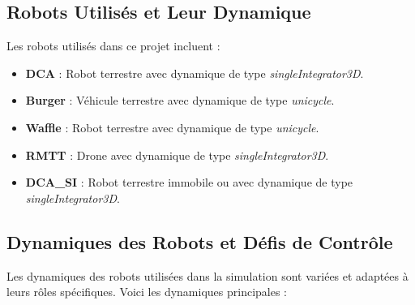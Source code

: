 \documentclass[a4paper,12pt]{article}
\begin{document}
\subsection*{Robots Utilisés et Leur Dynamique}
Les robots utilisés dans ce projet incluent :
\begin{itemize}
    \item \textbf{DCA} : Robot terrestre avec dynamique de type \textit{singleIntegrator3D}.
    \item \textbf{Burger} : Véhicule terrestre avec dynamique de type \textit{unicycle}.
    \item \textbf{Waffle} : Robot terrestre avec dynamique de type \textit{unicycle}.
    \item \textbf{RMTT} : Drone avec dynamique de type \textit{singleIntegrator3D}.
    \item \textbf{DCA\_SI} : Robot terrestre immobile ou avec dynamique de type \textit{singleIntegrator3D}.
\end{itemize}

\subsection*{Dynamiques des Robots et Défis de Contrôle}
Les dynamiques des robots utilisées dans la simulation sont variées et adaptées à leurs rôles spécifiques. Voici les dynamiques principales :
\end{document}
